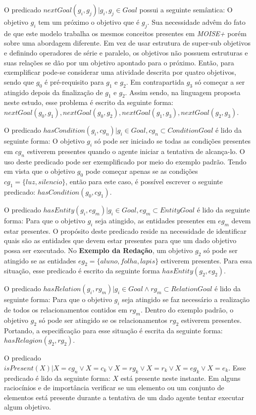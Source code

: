 O predicado $nextGoal(g_i,g_j) |g_i, g_j \in Goal$ possui a seguinte semântica: O objetivo $g_i$ tem um próximo o objetivo que 
é $g_j$. Sua necessidade advêm do fato de que este modelo trabalha os mesmos conceitos presentes em \textit{MOISE+} porém sobre
uma abordagem diferente. Em vez de usar estrutura de super-sub objetivos e definindo operadores de série e paralelo, os objetivos 
não possuem estruturas e suas relações se dão por um objetivo apontado para o próximo. Então, para exemplificar pode-se 
considerar uma atividade descrita por quatro objetivos, sendo que $g_0$ é pré-requisito para $g_1$ e $g_2$. Em contrapartida
$g_3$ só começar a ser atingido depois da finalização de $g_1$ e $g_2$. Assim sendo, na linguagem proposta neste estudo, 
esse problema é escrito da seguinte forma: $nextGoal(g_0,g_1), nextGoal(g_0,g_2), nextGoal(g_1,g_3), nextGoal(g_2,g_3)$.

O predicado $hasCondition(g_i,cg_n) | g_i \in Goal, cg_n \subset ConditionGoal$ é lido da seguinte forma: O objetivo $g_i$ só pode 
ser iniciado se todas as condições presentes em $cg_n$ estiverem presentes quando o agente iniciar a tentativa de alcança-lo. 
O uso deste predicado pode ser exemplificado por meio do exemplo padrão. Tendo em vista que o objetivo $g_0$ pode começar apenas 
se as condições $cg_1 = \{ luz, silencio \}$, então para este caso, é possível escrever o seguinte predicado: $hasCondition(g_0,cg_1)$.

O predicado $hasEntity(g_i,eg_m) | g_i \in Goal, eg_m \subset EntityGoal $ é lido da seguinte forma: Para que o objetivo $g_i$ seja atingido, as entidades presentes em $eg_m$ devem estar presentes. O propósito deste predicado reside na necessidade de identificar quais são as entidades que devem estar presentes para que um dado objetivo possa ser executado. No \textbf{Exemplo da Redação}, um objetivo $g_2$ só pode ser 
atingido se as entidades $eg_2 = \{ aluno, folha, lapis\}$ estiverem presentes. Para essa situação, esse predicado é escrito da 
seguinte forma $hasEntity(g_2,eg_2)$.

O predicado $hasRelation(g_i,rg_m) | g_i \in Goal \wedge rg_m \subset RelationGoal $ é lido da seguinte forma: Para que o objetivo $g_i$
seja atingido se faz necessário a realização de todos os relacionamentos contidos em $rg_m$. Dentro do exemplo padrão, o objetivo 
$g_2$ só pode ser atingido se os relacionamentos $rg_2$ estiverem presentes. Portando, a especificação para esse situação é escrita
da seguinte forma: $hasRelagion(g_2,rg_2)$.

O predicado $isPresent(X) | X = cg_n \vee X = c_k \vee  X = rg_k \vee X = r_k \vee X = eg_k \vee X = e_k $. Esse predicado é lido 
da seguinte forma: $X$ está presente neste instante. Em alguns raciocínios e de importância verificar se um elemento ou um conjunto
de elementos está presente durante a tentativa de um dado agente tentar executar algum objetivo.

